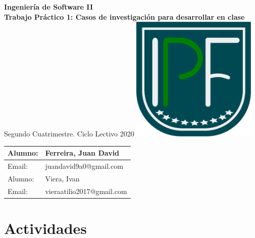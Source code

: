 \documentclass[titlepage,a4paper,twoside]{article}
\theoremstyle{definition}
\numberwithin{algorithm}{section}
\theoremstyle{remark}
\numberwithin{equation}{section}
\begin{document}
	
	
	\begin{titlepage}%
		\centering
		\vfill
		\Huge \textcolor{upforestgreen}{
			\textbf{Ingeniería de Software II\\
				Trabajo Práctico 1: Casos de investigación para desarrollar en clase}}
		\vskip2cm
		\Large
		Segundo Cuatrimestre. Ciclo Lectivo 2020
		\vfill
		\includegraphics[width=6cm]{LogoIPF.eps}
		\vfill
		\begin{tabular}{ | l | l | } %
			\hline
			Alumno: & Ferreira, Juan David      \\ \hline
			Email:  & juandavid9a0@gmail.com    \\ \hline
			Alumno: & Viera, Ivan               \\ \hline
			Email:  & vieraatilio2017@gmail.com \\ \hline
		\end{tabular}
		\vfill
		\vfill
	\end{titlepage}
    
    
    \tableofcontents %
    
    \newpage
    
    \section{Actividades}
    
\end{document}
